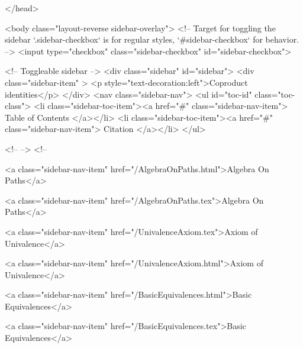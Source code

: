   
</head>




  <body class="layout-reverse sidebar-overlay">
    <!-- Target for toggling the sidebar `.sidebar-checkbox` is for regular
     styles, `#sidebar-checkbox` for behavior. -->
<input type="checkbox" class="sidebar-checkbox" id="sidebar-checkbox">

<!-- Toggleable sidebar -->
<div class="sidebar" id="sidebar">
  <div class="sidebar-item" >
    <p style="text-decoration:left">Coproduct identities</p>
  </div>
  <nav class="sidebar-nav">
    <ul id="toc-id" class="toc-class">
  <li class="sidebar-toc-item"><a href="#" class="sidebar-nav-item"> Table of Contents </a></li>
  <li class="sidebar-toc-item"><a href="#" class="sidebar-nav-item"> Citation </a></li>
</ul>


    <!--  -->
    <!-- 
      
    
      
    
      
    
      
    
      
        
      
    
      
        
          <a class="sidebar-nav-item" href="/AlgebraOnPaths.html">Algebra On Paths</a>
        
      
    
      
        
          <a class="sidebar-nav-item" href="/AlgebraOnPaths.tex">Algebra On Paths</a>
        
      
    
      
        
          <a class="sidebar-nav-item" href="/UnivalenceAxiom.tex">Axiom of Univalence</a>
        
      
    
      
        
          <a class="sidebar-nav-item" href="/UnivalenceAxiom.html">Axiom of Univalence</a>
        
      
    
      
        
          <a class="sidebar-nav-item" href="/BasicEquivalences.html">Basic Equivalences</a>
        
      
    
      
        
          <a class="sidebar-nav-item" href="/BasicEquivalences.tex">Basic Equivalences</a>
        
